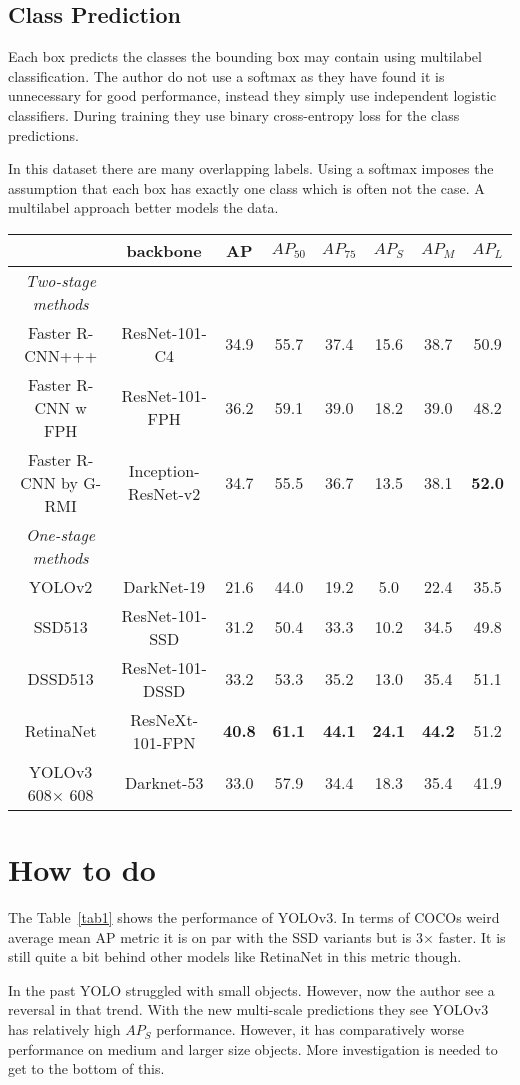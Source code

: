 \documentclass[10pt,twocolumn,letterpaper]{article}
\begin{document}
\subsection{Class Prediction}
Each box predicts the classes the bounding box may contain using multilabel classification. The author do not use a softmax as they have found it is unnecessary for good performance, instead they simply use independent logistic classifiers. During training they use binary cross-entropy loss for the class
predictions.
\par 
In this dataset there are many overlapping labels. Using a softmax imposes the assumption that each box has exactly one class which is often not the case. A multilabel approach better models the data.
\begin{table*}
\small
\renewcommand\arraystretch{1.2}
\centering
\begin{tabular}{c|c|ccc|ccc}
 & backbone & AP & $AP_{50}$ & $AP_{75}$ & $AP_S$ & $AP_M$ & $AP_L$\\
\hline 
\emph{Two-stage methods} \\
Faster R-CNN+++\cite{He2015Deep}& ResNet-101-C4 & 34.9 & 55.7 & 37.4 & 15.6 & 38.7 & 50.9 \\
Faster R-CNN w FPH\cite{Lin2016Feature} & ResNet-101-FPH & 36.2 & 59.1 & 39.0 & 18.2 & 39.0 & 48.2 \\
Faster R-CNN by G-RMI & Inception-ResNet-v2 & 34.7 & 55.5 & 36.7 & 13.5 & 38.1 & \textbf{52.0} \\
\hline
\emph{One-stage methods} \\
YOLOv2 \cite{Redmon2017YOLO9000} & DarkNet-19 & 21.6 & 44.0 & 19.2 & 5.0 & 22.4 & 35.5 \\
SSD513 & ResNet-101-SSD & 31.2 & 50.4 & 33.3 & 10.2 & 34.5 & 49.8 \\
DSSD513 & ResNet-101-DSSD & 33.2 & 53.3 & 35.2 & 13.0 & 35.4 & 51.1\\
RetinaNet & ResNeXt-101-FPN & \textbf{40.8} & \textbf{61.1} & \textbf{44.1} & \textbf{24.1} & \textbf{44.2} & 51.2 \\
YOLOv3 608$\times$ 608 & Darknet-53 & 33.0 & 57.9 & 34.4 & 18.3 & 35.4 & 41.9 \\
\end{tabular} 
\caption{YOLOv3 is much better than SSD variants and comparable to state-of the-art models on the $AP_{50}$ metric.}
\label{tab1}
\end{table*}
\section{How to do}
The Table~\ref{tab1} shows the performance of YOLOv3. In terms of COCOs weird average mean AP metric it is on par with the SSD variants but is 3$\times$ faster. It is still quite a bit behind other models like RetinaNet in this metric though.
\par
In the past YOLO struggled with small objects. However, now the author see a reversal in that trend. With the new multi-scale predictions they see YOLOv3 has relatively high $AP_S$ performance. However, it has comparatively worse performance on medium and larger size objects. More investigation is needed to get to the bottom of this.

{\small


}
\end{document}
